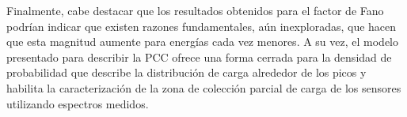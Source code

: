 Finalmente, cabe destacar que los resultados obtenidos para el factor de Fano podrían indicar que existen razones fundamentales, aún inexploradas, que hacen que esta magnitud aumente para energías cada vez menores. A su vez, el modelo presentado para describir la PCC ofrece una forma cerrada para la densidad de probabilidad que describe la distribución de carga alrededor de los picos y habilita la caracterización de la zona de colección parcial de carga de los sensores utilizando espectros medidos. 
